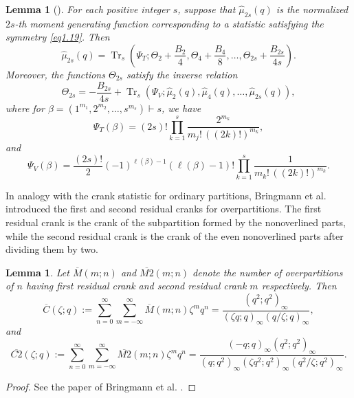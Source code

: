 \documentclass[12pt,oneside,reqno]{amsart}
\numberwithin{equation}{section}
\newtheorem{lemma}[theorem]{{\bf Lemma}}
\begin{document}
	\begin{lemma}[{\cite[Theorem 1.3]{Kang2026}}]\label{KANG}
		For each positive integer $s$, suppose that
		$\widehat{\mu}_{2s}(q)$ is the normalized $2s$-th moment generating
		function corresponding to a statistic satisfying the symmetry
		\eqref{eq1.19}. Then
		\begin{equation}\label{eq1.24}
			\widehat{\mu}_{2s}(q)
			=
			\operatorname{Tr}_s\left(
			\Psi_T;
			\Theta_2+\frac{B_2}{4},
			\Theta_4+\frac{B_4}{8},
			\ldots,
			\Theta_{2s}+\frac{B_{2s}}{4s}
			\right).
		\end{equation}
		Moreover, the functions $\Theta_{2s}$ satisfy the inverse relation
		\begin{equation}\label{eq1.25}
			\Theta_{2s}
			=
			-\frac{B_{2s}}{4s}
			+
			\operatorname{Tr}_s
			\left(
			\Psi_V;
			\widehat{\mu}_2(q),\widehat{\mu}_4(q),
			\ldots,\widehat{\mu}_{2s}(q)
			\right),
		\end{equation}
		where for $\beta=(1^{m_1},2^{m_2},\ldots,s^{m_s})\vdash s$, we have 
		\begin{equation*} 
			\Psi_T(\beta) 
			= 
			(2s)! 
			\prod_{k=1}^{s} 
			\frac{2^{m_k}} 
			{m_j!\,((2k)!)^{m_k}}, 
		\end{equation*} 
		and 
		\begin{equation*} 
			\Psi_V(\beta) 
			= 
			\frac{(2s)!}{2} 
			(-1)^{\ell(\beta)-1} 
			(\ell(\beta)-1)! 
			\prod_{k=1}^{s} 
			\frac{1} 
			{m_k!\,((2k)!)^{m_k}}. 
		\end{equation*} 
	\end{lemma}
	
	
	In analogy with the crank statistic for ordinary partitions, Bringmann et al. \cite{BringmannO2009} introduced the first and second residual cranks for overpartitions. The first residual crank is the crank of the subpartition formed by the nonoverlined parts, while the second residual crank is the crank of the even nonoverlined parts after dividing them by two.
	\begin{lemma}
	 Let $\overline{M}(m;n)$ and $\overline{M2}(m;n)$ denote the number of overpartitions of $n$ having first residual crank and second residual crank $m$ respectively. Then
	\begin{equation}\label{eq:1.2}
	\overline{C}(\zeta;q)
	:=
	\sum_{n=0}^{\infty}
	\sum_{m=-\infty}^{\infty}
	\overline{M}(m;n)\zeta^{m}q^{n}
	=
	\frac{(q^{2};q^{2})_{\infty}}
	{(\zeta q;q)_{\infty}(q/\zeta;q)_{\infty}},
	\end{equation}
	and
	\begin{equation}\label{eq:1.3}
	\overline{C2}(\zeta;q)
	:=
	\sum_{n=0}^{\infty}
	\sum_{m=-\infty}^{\infty}
	\overline{M2}(m;n)\zeta^{m}q^{n}
	=
	\frac{(-q;q)_{\infty}(q^{2};q^{2})_{\infty}}
	{(q;q^{2})_{\infty}
		(\zeta q^{2};q^{2})_{\infty}
		(q^{2}/\zeta;q^{2})_{\infty}}.
		\end{equation}
\end{lemma}
\begin{proof}
	See the paper of Bringmann et al. \cite{BringmannO2009}.
\end{proof}
\end{document}
